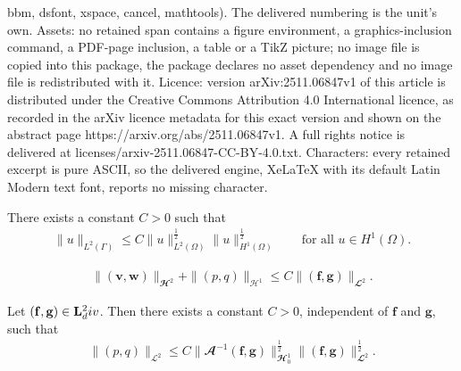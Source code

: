 \documentclass[10pt,a4paper]{amsart}
\newcommand{\Div}{\textnormal{div}}
\newcommand{\Ga}{\Gamma}
\newcommand{\Om}{\Omega}
\newcommand{\bv}{\mathbf{v}}
\newcommand{\bw}{\mathbf{w}}
\newcommand{\f}{\mathbf{f}}
\newcommand{\g}{\mathbf{g}}
\newcommand{\norm}[1]{\| #1 \|}
\begin{document}
bbm, dsfont, xspace, cancel, mathtools). The delivered numbering is the unit's own. Assets: no retained span contains a figure environment, a graphics-inclusion command, a PDF-page inclusion, a table or a TikZ picture; no image file is copied into this package, the package declares no asset dependency and no image file is redistributed with it. Licence: version arXiv:2511.06847v1 of this article is distributed under the Creative Commons Attribution 4.0 International licence, as recorded in the arXiv licence metadata for this exact version and shown on the abstract page https://arxiv.org/abs/2511.06847v1. A full rights notice is delivered at licenses/arxiv-2511.06847-CC-BY-4.0.txt. Characters: every retained excerpt is pure ASCII, so the delivered engine, XeLaTeX with its default Latin Modern text font, reports no missing character.
\begin{lemma}\label{Prelim:Lemma:Interpol:Trace}
    There exists a constant $C > 0$ such that
    \begin{align}\label{InterpolEst:Trace:L^2}
        \norm{u}_{L^2(\Ga)}\leq C\norm{u}_{L^2(\Om)}^{\frac12}\norm{u}_{H^1(\Om)}^{\frac12} \qquad\text{for all~}u\in H^1(\Om).
    \end{align}
\end{lemma}

    \begin{align}\label{App:Est:BulkSurfaceStokes}
        \norm{(\bv,\bw)}_{\mathbfcal{H}^2} + \norm{(p,q)}_{\mathcal{H}^1} \leq C\norm{(\f,\g)}_{\mathbfcal{L}^2}.
    \end{align}

\begin{lemma}
    Let $(\f,\g)\in\mathbf{L}^2_\Div$. Then there exists a constant $C > 0$, independent of $\f$ and $\g$, such that
    \begin{align}\label{App:Est:Pressure}
        \norm{(p,q)}_{\mathcal{L}^2} \leq C\norm{\mathbfcal{A}^{-1}(\f,\g)}_{\mathbfcal{H}^1_{0}}^{\frac12}\norm{(\f,\g)}_{\mathbfcal{L}^2}^{\frac12}.
    \end{align}
\end{lemma}
\end{document}
